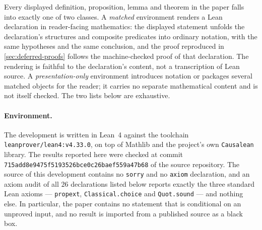 \documentclass[11pt]{article}
\begin{document}
Every displayed definition, proposition, lemma and theorem in the paper falls into exactly one of two classes. A \emph{matched} environment renders a Lean declaration in reader-facing mathematics: the displayed statement unfolds the declaration's structures and composite predicates into ordinary notation, with the same hypotheses and the same conclusion, and the proof reproduced in \cref{sec:deferred-proofs} follows the machine-checked proof of that declaration. The rendering is faithful to the declaration's content, not a transcription of Lean source. A \emph{presentation-only} environment introduces notation or packages several matched objects for the reader; it carries no separate mathematical content and is not itself checked. The two lists below are exhaustive.

\paragraph{Environment.} The development is written in Lean~4 against the toolchain \texttt{leanprover/lean4:v4.33.0}, on top of Mathlib and the project's own \texttt{Causalean} library. The results reported here were checked at commit \texttt{715add8e9475f5193526bce0c26baef559a47b68} of the source repository. The source of this development contains no \texttt{sorry} and no \texttt{axiom} declaration, and an axiom audit of all \(26\) declarations listed below reports exactly the three standard Lean axioms --- \texttt{propext}, \texttt{Classical.choice} and \texttt{Quot.sound} --- and nothing else. In particular, the paper contains no statement that is conditional on an unproved input, and no result is imported from a published source as a black box.
\end{document}
